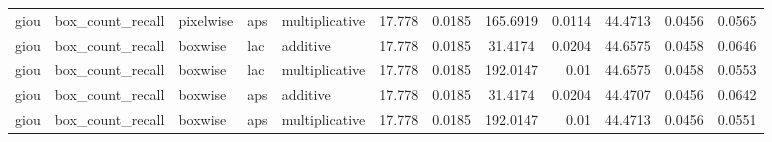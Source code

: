 \begin{table*}[htbp]
\begin{tabular}{@{}lllll rrcrrcr@{}}
giou & box\_count\_recall & pixelwise & aps & multiplicative & 17.778 & 0.0185 & 165.6919 & 0.0114 & 44.4713 & 0.0456 & 0.0565 \\
giou & box\_count\_recall & boxwise & lac & additive & 17.778 & 0.0185 & 31.4174 & 0.0204 & 44.6575 & 0.0458 & 0.0646 \\
giou & box\_count\_recall & boxwise & lac & multiplicative & 17.778 & 0.0185 & 192.0147 & 0.01 & 44.6575 & 0.0458 & 0.0553 \\
giou & box\_count\_recall & boxwise & aps & additive & 17.778 & 0.0185 & 31.4174 & 0.0204 & 44.4707 & 0.0456 & 0.0642 \\
giou & box\_count\_recall & boxwise & aps & multiplicative & 17.778 & 0.0185 & 192.0147 & 0.01 & 44.4713 & 0.0456 & 0.0551 \\
    \bottomrule
    \end{tabular}
    \end{table*}
    